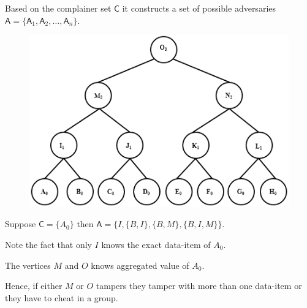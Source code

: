 \documentclass[%
  slidesonly,%
  semlayer%
  ]{seminar}                                  %
\begin{document}
\begin{slide}
        Based on the complainer set $\textsf{C}$ it constructs a set of possible adversaries $\textsf{A} = \{\textsf{A}_{1},\textsf{A}_{2},\dotsc,\textsf{A}_{n}\}$. 

        \begin{figure}[t]
          \centering
          \includegraphics[scale=0.4]{images/possible-cheaters.png}
        \end{figure}

        Suppose $\textsf{C}=\{A_{0}\}$ then $\textsf{A} =\{I,\{B,I\},\{B,M\},\{B,I,M\}\}$. 

        Note the fact that only $I$ knows the exact data-item of $A_{0}$. 
        
        The vertices $M$ and $O$ knows aggregated value of $A_{0}$. 
        
        Hence, if either $M$ or $O$ tampers they tamper with more than one data-item or they have to cheat in a group. 


\end{slide}
\end{document}
